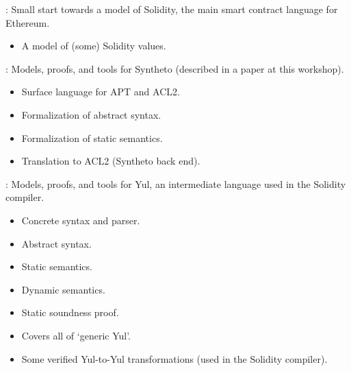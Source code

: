 
\begin{frame}

\newlibtitle

:
Small start towards a model of Solidity,
the main smart contract language for Ethereum.
\begin{itemize}
\item A model of (some) Solidity values.
\end{itemize}

\end{frame}


\begin{frame}

\newlibtitle

:
Models, proofs, and tools for Syntheto (described in a paper at this workshop).
\begin{itemize}
\item Surface language for APT and ACL2.
\item Formalization of abstract syntax.
\item Formalization of static semantics.
\item Translation to ACL2 (Syntheto back end).
\end{itemize}

\end{frame}


\begin{frame}

\newlibtitle

:
Models, proofs, and tools for Yul,
an intermediate language used in the Solidity compiler.
\begin{itemize}
\item Concrete syntax and parser.
\item Abstract syntax.
\item Static semantics.
\item Dynamic semantics.
\item Static soundness proof.
\item Covers all of `generic Yul'.
\item Some verified Yul-to-Yul transformations (used in the Solidity compiler).
\end{itemize}

\end{frame}

